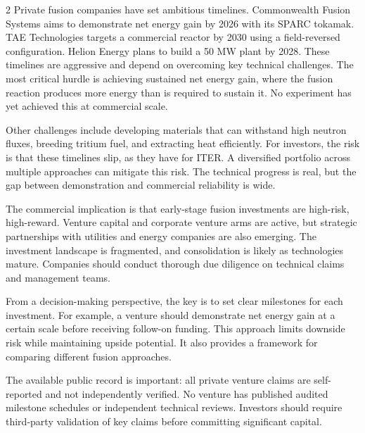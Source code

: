 \documentclass[10pt,a4paper]{article}
\begin{document}
\begin{multicols}{2}
{\small Private fusion companies have set ambitious timelines. Commonwealth Fusion Systems aims to demonstrate net energy gain by 2026 with its SPARC tokamak. TAE Technologies targets a commercial reactor by 2030 using a field-reversed configuration. Helion Energy plans to build a 50 MW plant by 2028. These timelines are aggressive and depend on overcoming key technical challenges. The most critical hurdle is achieving sustained net energy gain, where the fusion reaction produces more energy than is required to sustain it. No experiment has yet achieved this at commercial scale.}\par
{\small Other challenges include developing materials that can withstand high neutron fluxes, breeding tritium fuel, and extracting heat efficiently. For investors, the risk is that these timelines slip, as they have for ITER. A diversified portfolio across multiple approaches can mitigate this risk. The technical progress is real, but the gap between demonstration and commercial reliability is wide.}\par
{\small The commercial implication is that early-stage fusion investments are high-risk, high-reward. Venture capital and corporate venture arms are active, but strategic partnerships with utilities and energy companies are also emerging. The investment landscape is fragmented, and consolidation is likely as technologies mature. Companies should conduct thorough due diligence on technical claims and management teams.}\par
{\small From a decision-making perspective, the key is to set clear milestones for each investment. For example, a venture should demonstrate net energy gain at a certain scale before receiving follow-on funding. This approach limits downside risk while maintaining upside potential. It also provides a framework for comparing different fusion approaches.}\par
{\small The available public record is important: all private venture claims are self-reported and not independently verified. No venture has published audited milestone schedules or independent technical reviews. Investors should require third-party validation of key claims before committing significant capital.}\par
\end{multicols}
\label{chap:2:end}
\end{document}
